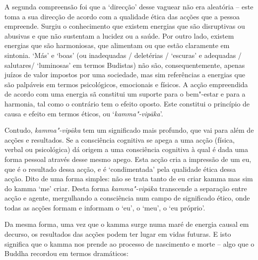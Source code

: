A segunda compreensão foi que a `direcção' desse vaguear não era aleatória --
este toma a sua direcção de acordo com a qualidade ética das acções que a pessoa
empreende. Surgiu o conhecimento que existem energias que são disruptivas ou
abusivas e que não sustentam a lucidez ou a saúde. Por outro lado, existem
energias que são harmoniosas, que alimentam ou que estão claramente em sintonia.
`Más' e `boas' (ou inadequadas / deletérias / `escuras' e
adequadas / salutares/ `luminosas' em termos Budistas) não são, consequentemente,
apenas juízos de valor impostos por uma sociedade, mas sim referências a
energias que são palpáveis em termos psicológicos, emocionais e físicos. A acção
empreendida de acordo com uma energia sã constitui um suporte para o bem"-estar e
para a harmonia, tal como o contrário tem o efeito oposto. Este constitui o
princípio de causa e efeito em termos éticos, ou `\emph{kamma"-vipāka}'.

Contudo, \emph{kamma"-vipāka} tem um significado mais profundo, que vai para além
de acções e resultados. Se a consciência cognitiva se apega a uma acção (física,
verbal ou psicológica) dá origem a uma consciência cognitiva à qual é dada uma
forma pessoal através desse mesmo apego. Esta acção cria a impressão de um eu,
que é o resultado dessa acção, e é `condimentada' pela qualidade ética dessa
acção. Dito de uma forma simples: não se trata tanto de eu criar kamma mas sim
do kamma `me' criar. Desta forma \emph{kamma"-vipāka} transcende a separação
entre acção e agente, mergulhando a consciência num campo de significado ético,
onde todas as acções formam e informam o `eu', o `meu', o `eu próprio'.

Da mesma forma, uma vez que o kamma surge numa maré de energia causal em
decurso, os resultados das acções podem ter lugar em vidas futuras. E isto
significa que o kamma nos prende ao processo de nascimento e morte -- algo que o
Buddha recordou em termos dramáticos:

